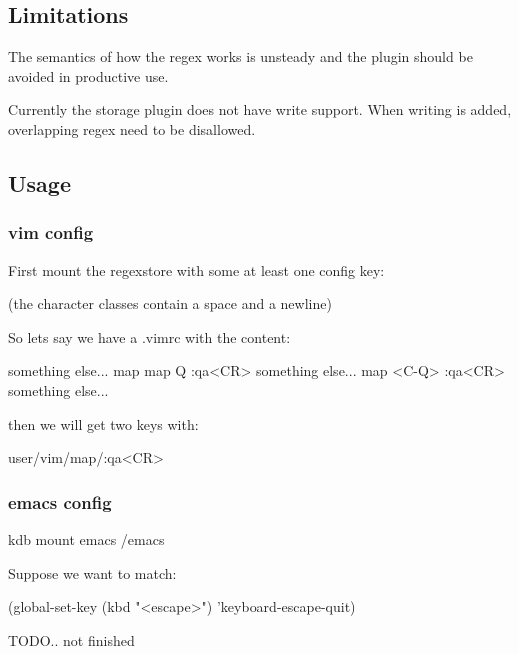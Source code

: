 \subsection*{Limitations}

The semantics of how the regex works is unsteady and the plugin should be avoided in productive use.

Currently the storage plugin does not have write support. When writing is added, overlapping regex need to be disallowed.

\subsection*{Usage}

\subsubsection*{vim config}

First mount the regexstore with some at least one config key\+: 


(the character classes contain a space and a newline)

So lets say we have a .vimrc with the content\+: \begin{DoxyVerb}something else...
map map Q :qa<CR>
something else...
map <C-Q> :qa<CR>
something else...
\end{DoxyVerb}


then we will get two keys with\+: \begin{DoxyVerb}user/vim/map/:qa<CR>
\end{DoxyVerb}


\subsubsection*{emacs config}

\begin{DoxyVerb}kdb mount emacs /emacs
\end{DoxyVerb}


Suppose we want to match\+: \begin{DoxyVerb}(global-set-key (kbd "<escape>")      'keyboard-escape-quit)
\end{DoxyVerb}


T\+O\+D\+O.. not finished 